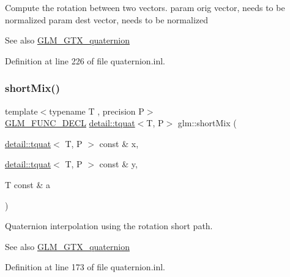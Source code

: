 Compute the rotation between two vectors. param orig vector, needs to be normalized param dest vector, needs to be normalized

\begin{DoxySeeAlso}{See also}
\hyperlink{group__gtx__quaternion}{G\+L\+M\+\_\+\+G\+T\+X\+\_\+quaternion} 
\end{DoxySeeAlso}


Definition at line 226 of file quaternion.\+inl.

\mbox{\label{group__gtx__quaternion_ga297f92682708e59bda1849ca3aad0fea}} 
\subsubsection{\texorpdfstring{short\+Mix()}{shortMix()}}
{\footnotesize\ttfamily template$<$typename T , precision P$>$ \\
\hyperlink{setup_8hpp_ab2d052de21a70539923e9bcbf6e83a51}{G\+L\+M\+\_\+\+F\+U\+N\+C\+\_\+\+D\+E\+CL} \hyperlink{structglm_1_1detail_1_1tquat}{detail\+::tquat}$<$T, P$>$ glm\+::short\+Mix (\begin{DoxyParamCaption}\item[{\hyperlink{structglm_1_1detail_1_1tquat}{detail\+::tquat}$<$ T, P $>$ const \&}]{x,  }\item[{\hyperlink{structglm_1_1detail_1_1tquat}{detail\+::tquat}$<$ T, P $>$ const \&}]{y,  }\item[{T const \&}]{a }\end{DoxyParamCaption})}

Quaternion interpolation using the rotation short path.

\begin{DoxySeeAlso}{See also}
\hyperlink{group__gtx__quaternion}{G\+L\+M\+\_\+\+G\+T\+X\+\_\+quaternion} 
\end{DoxySeeAlso}


Definition at line 173 of file quaternion.\+inl.

\mbox{\label{group__gtx__quaternion_ga5e756a5817856a3d69f0974fac8322e2}} 
